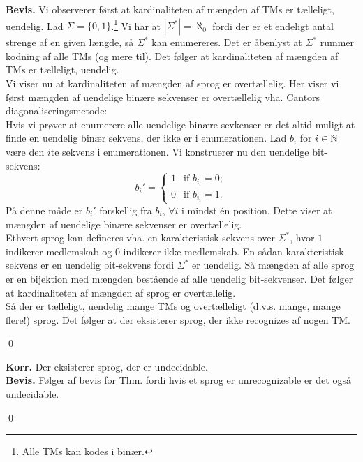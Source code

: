 \textbf{Bevis.} Vi observerer først at kardinaliteten af mængden af TMs er tælleligt, uendelig. Lad $\Sigma=\{0,1\}$.\footnote{Alle TMs kan kodes i binær.} Vi har at $|\Sigma^*|=\aleph_0$ fordi der er et endeligt antal strenge af en given længde, så $\Sigma^*$ kan enumereres. Det er åbenlyst at $\Sigma^*$ rummer kodning af alle TMs (og mere til). Det følger at kardinaliteten af mængden af TMs er tælleligt, uendelig. \\

Vi viser nu at kardinaliteten af mængden af sprog er overtællelig. Her viser vi først mængden af uendelige binære sekvenser er overtællelig vha. Cantors diagonaliseringsmetode: \\

Hvis vi prøver at enumerere alle uendelige binære sevkenser er det altid muligt at finde en uendelig binær sekvens, der ikke er i enumerationen. Lad $b_i$ for $i \in \mathbb{N}$ være den $i$te sekvens i enumerationen. Vi konstruerer nu den uendelige bit-sekvens:
\[b_i'= \left\{ \begin{array}{ll}1 & \mbox{if $b_{i_i} = 0$};\\0 & \mbox{if $b_{i_i}=1$}.\end{array} \right. \] 
På denne måde er $b_i'$ forskellig fra $b_i$, $\forall i$ i mindst én position. Dette viser at mængden af uendelige binære sekvenser er overtællelig. \\

Ethvert sprog kan defineres vha. en karakteristisk sekvens over $\Sigma^*$, hvor $1$ indikerer medlemskab og $0$ indikerer ikke-medlemskab. En sådan karakteristisk sekvens er en uendelig bit-sekvens fordi $\Sigma^*$ er uendelig. Så mængden af alle sprog er en bijektion med mængden bestående af alle uendelig bit-sekvenser. Det følger at kardinaliteten af mængden af sprog er overtællelig. \\

Så der er tælleligt, uendelig mange TMs og overtælleligt (d.v.s. mange, mange flere!) sprog. Det følger at der eksisterer sprog, der ikke recognizes af nogen TM. \\
\begin{flushright}
	\qed
\end{flushright}

\textbf{Korr.} Der eksisterer sprog, der er undecidable. \\

\textbf{Bevis.} Følger af bevis for Thm. fordi hvis et sprog er unrecognizable er det også undecidable.   
\begin{flushright}
	\qed
\end{flushright}

